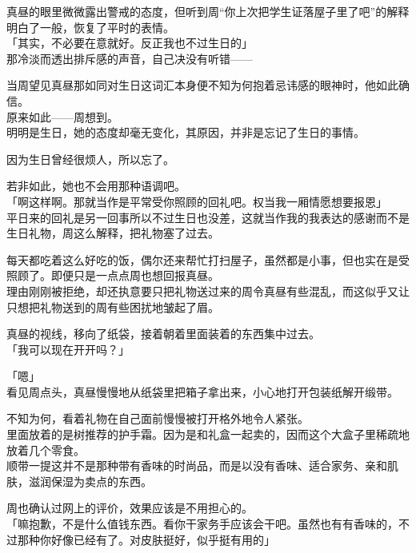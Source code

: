 真昼的眼里微微露出警戒的态度，但听到周“你上次把学生证落屋子里了吧”的解释明白了一般，恢复了平时的表情。\\

「其实，不必要在意就好。反正我也不过生日的」\\

那冷淡而透出排斥感的声音，自己决没有听错——

当周望见真昼那如同对生日这词汇本身便不知为何抱着忌讳感的眼神时，他如此确信。\\

原来如此——周想到。\\

明明是生日，她的态度却毫无变化，其原因，并非是忘记了生日的事情。

因为生日曾经很烦人，所以忘了。

若非如此，她也不会用那种语调吧。\\

「啊这样啊。那就当作是平常受你照顾的回礼吧。权当我一厢情愿想要报恩」\\

平日来的回礼是另一回事所以不过生日也没差，这就当作我的我表达的感谢而不是生日礼物，周这么解释，把礼物塞了过去。

每天都吃着这么好吃的饭，偶尔还来帮忙打扫屋子，虽然都是小事，但也实在是受照顾了。即便只是一点点周也想回报真昼。\\

理由刚刚被拒绝，却还执意要只把礼物送过来的周令真昼有些混乱，而这似乎又让只想把礼物送到的周有些困扰地皱起了眉。

真昼的视线，移向了纸袋，接着朝着里面装着的东西集中过去。\\

「我可以现在开开吗？」

「嗯」\\

看见周点头，真昼慢慢地从纸袋里把箱子拿出来，小心地打开包装纸解开缎带。

不知为何，看着礼物在自己面前慢慢被打开格外地令人紧张。\\

里面放着的是树推荐的护手霜。因为是和礼盒一起卖的，因而这个大盒子里稀疏地放着几个零食。\\

顺带一提这并不是那种带有香味的时尚品，而是以没有香味、适合家务、亲和肌肤，滋润保湿为卖点的东西。

周也确认过网上的评价，效果应该是不用担心的。\\

「嘛抱歉，不是什么值钱东西。看你干家务手应该会干吧。虽然也有有香味的，不过那种你好像已经有了。对皮肤挺好，似乎挺有用的」

